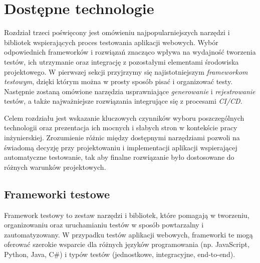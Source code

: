 \documentclass[12pt]{report}
\begin{document}
\chapter{Dostępne technologie}
Rozdział trzeci poświęcony jest omówieniu najpopularniejszych narzędzi i bibliotek wspierających proces testowania aplikacji webowych. Wybór odpowiednich frameworków i rozwiązań znacząco wpływa na wydajność tworzenia testów, ich utrzymanie oraz integrację z pozostałymi elementami środowiska projektowego. W pierwszej sekcji przyjrzymy się najistotniejszym \textit{frameworkom testowym}, dzięki którym można w prosty sposób pisać i organizować testy. Następnie zostaną omówione narzędzia usprawniające \emph{generowanie} i \emph{rejestrowanie} testów, a także najważniejsze rozwiązania integrujące się z procesami \emph{CI/CD}.

Celem rozdziału jest wskazanie kluczowych czynników wyboru poszczególnych technologii oraz prezentacja ich mocnych i słabych stron w kontekście pracy inżynierskiej. Zrozumienie różnic między dostępnymi narzędziami pozwoli na świadomą decyzję przy projektowaniu i implementacji aplikacji wspierającej automatyczne testowanie, tak aby finalne rozwiązanie było dostosowane do różnych warunków projektowych.

\section{Frameworki testowe}
Framework testowy to zestaw narzędzi i bibliotek, które pomagają w tworzeniu, organizowaniu oraz uruchamianiu testów w sposób powtarzalny i zautomatyzowany. W przypadku testów aplikacji webowych, frameworki te mogą oferować szerokie wsparcie dla różnych języków programowania (np. JavaScript, Python, Java, C\#) i typów testów (jednostkowe, integracyjne, end-to-end).
\end{document}
